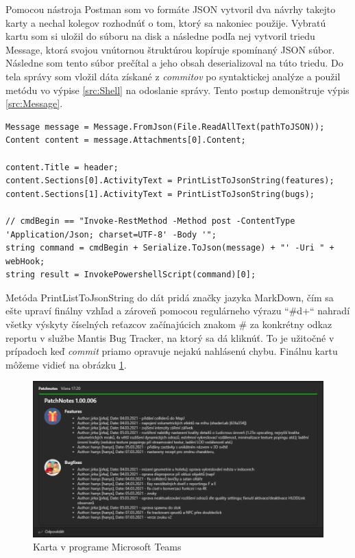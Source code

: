 \documentclass[slovak,bachelorpractice,dept460,male,csharp,cpdeclaration]{diploma}
\begin{document}
Pomocou nástroja Postman som vo formáte JSON vytvoril dva návrhy takejto karty a nechal kolegov rozhodnúť o tom, ktorý sa nakoniec použije. Vybratú kartu som si uložil do súboru na disk a následne podľa nej vytvoril triedu Message, ktorá svojou vnútornou štruktúrou kopíruje spomínaný JSON súbor. Následne som tento súbor prečítal a jeho obsah deserializoval na túto triedu. Do tela správy som vložil dáta získané z \textit{commitov} po syntaktickej analýze a použil metódu vo výpise \ref{src:Shell} na odoslanie správy. Tento postup demonštruje výpis \ref{src:Message}. 
\vspace{10pt}
\begin{lstlisting}[label=src:Message,caption={Vytvorenie a odoslanie správy do služby Microsoft Teams}]
Message message = Message.FromJson(File.ReadAllText(pathToJSON));
Content content = message.Attachments[0].Content;

content.Title = header;
content.Sections[0].ActivityText = PrintListToJsonString(features);
content.Sections[1].ActivityText = PrintListToJsonString(bugs);

// cmdBegin == "Invoke-RestMethod -Method post -ContentType 'Application/Json; charset=UTF-8' -Body '";
string command = cmdBegin + Serialize.ToJson(message) + "' -Uri " + webHook;
string result = InvokePowershellScript(command)[0];
\end{lstlisting}

Metóda PrintListToJsonString do dát pridá značky jazyka MarkDown, čím sa ešte upraví finálny vzhľad a zároveň pomocou regulárneho výrazu \mbox{``\#\\d+``} nahradí všetky výskyty číselných reťazcov začínajúcich znakom \# za konkrétny odkaz reportu v službe Mantis Bug Tracker, na ktorý sa dá kliknúť. To je užitočné v prípadoch keď \textit{commit} priamo opravuje nejakú nahlásenú chybu. Finálnu kartu môžeme vidieť na obrázku \ref{pic:Logger}.

\begin{figure}[!htbp]
	\centering
	\includegraphics[width=1\textwidth]{Pictures/gitlogger.png}
	\caption{Karta v programe Microsoft Teams}
	\label{pic:Logger}
\end{figure}
\end{document}
